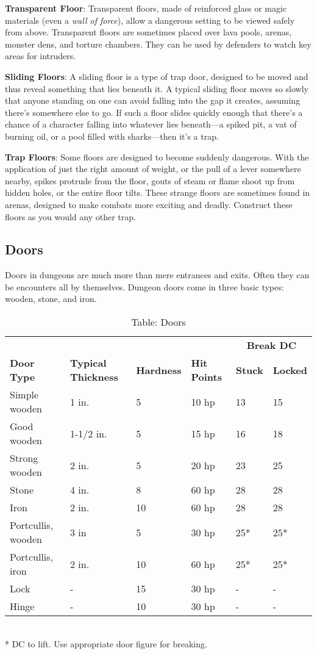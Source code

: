 \textbf{Transparent Floor}: Transparent floors, made of reinforced glass or magic materials (even a \textit{wall of force}), allow a dangerous setting to be viewed safely from above. Transparent floors are sometimes placed over lava pools, arenas, monster dens, and torture chambers. They can be used by defenders to watch key areas for intruders.
				
\textbf{Sliding Floors}: A sliding floor is a type of trap door, designed to be moved and thus reveal something that lies beneath it. A typical sliding floor moves so slowly that anyone standing on one can avoid falling into the gap it creates, assuming there's somewhere else to go. If such a floor slides quickly enough that there's a chance of a character falling into whatever lies beneath---a spiked pit, a vat of burning oil, or a pool filled with sharks---then it's a trap.
				
\textbf{Trap Floors}: Some floors are designed to become suddenly dangerous. With the application of just the right amount of weight, or the pull of a lever somewhere nearby, spikes protrude from the floor, gouts of steam or flame shoot up from hidden holes, or the entire floor tilts. These strange floors are sometimes found in arenas, designed to make combats more exciting and deadly. Construct these floors as you would any other trap. 
				
\subsection{Doors}

				
Doors in dungeons are much more than mere entrances and exits. Often they can be encounters all by themselves. Dungeon doors come in three basic types: wooden, stone, and iron.
\begin{table*}[]
\sffamily
\caption{Table: Doors}
\begin{tabular}{llllll}
                   &                            &                   &                     & \multicolumn{2}{c}{\textbf{Break DC}}\\
\textbf{Door Type} & \textbf{Typical Thickness} & \textbf{Hardness} & \textbf{Hit Points} & \textbf{Stuck} & \textbf{Locked}\\

Simple wooden & 1 in. & 5 & 10 hp & 13 & 15 \\
 Good wooden & 1-1/2 in. & 5 & 15 hp & 16 & 18 \\
 Strong wooden & 2 in. & 5 & 20 hp & 23 & 25 \\
 Stone & 4 in. & 8 & 60 hp & 28 & 28 \\
 Iron & 2 in. & 10 & 60 hp & 28 & 28 \\
 Portcullis, wooden & 3 in & 5 & 30 hp & 25* & 25* \\
 Portcullis, iron & 2 in. & 10 & 60 hp & 25* & 25* \\
 Lock & - & 15 & 30 hp & - & - \\
 Hinge & - & 10 & 30 hp & - & -\\
\end{tabular} \\
* DC to lift. Use appropriate door figure for breaking.\\
\end{table*}
				

